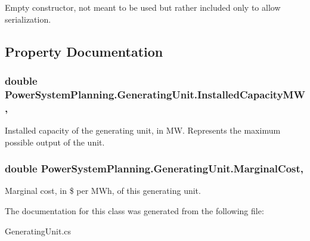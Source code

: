 Empty constructor, not meant to be used but rather included only to allow serialization. 



\subsection{Property Documentation}
\subsubsection[{\texorpdfstring{Installed\+Capacity\+MW}{InstalledCapacityMW}}]{\setlength{\rightskip}{0pt plus 5cm}double Power\+System\+Planning.\+Generating\+Unit.\+Installed\+Capacity\+MW\hspace{0.3cm}{\ttfamily [get]}, {\ttfamily [set]}}\hypertarget{class_power_system_planning_1_1_generating_unit_a85c9d9099840f3238ca341dd313b56f4}{}\label{class_power_system_planning_1_1_generating_unit_a85c9d9099840f3238ca341dd313b56f4}


Installed capacity of the generating unit, in MW. Represents the maximum possible output of the unit. 

\subsubsection[{\texorpdfstring{Marginal\+Cost}{MarginalCost}}]{\setlength{\rightskip}{0pt plus 5cm}double Power\+System\+Planning.\+Generating\+Unit.\+Marginal\+Cost\hspace{0.3cm}{\ttfamily [get]}, {\ttfamily [set]}}\hypertarget{class_power_system_planning_1_1_generating_unit_aec21179f99b2060e9c30ca59b0beab44}{}\label{class_power_system_planning_1_1_generating_unit_aec21179f99b2060e9c30ca59b0beab44}


Marginal cost, in \$ per M\+Wh, of this generating unit. 



The documentation for this class was generated from the following file\+:\begin{DoxyCompactItemize}
\item 
Generating\+Unit.\+cs\end{DoxyCompactItemize}
